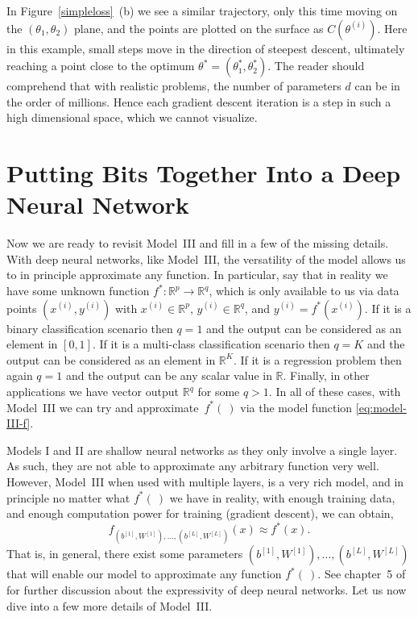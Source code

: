 \documentclass[12pt]{article}
\begin{document}
In Figure~\ref{simpleloss}~(b) we see a similar trajectory, only this time moving on the $(\theta_1, \theta_2)$ plane, and the points are plotted on the surface as $C(\theta^{(i)})$. Here in this example, small steps move in the direction of steepest descent, ultimately reaching a point close to the optimum $\theta^* = (\theta_1^*, \theta_2^*)$. The reader should comprehend that with realistic problems, the number of parameters $d$ can be in the order of millions. Hence each gradient descent iteration is a step in such a high dimensional space, which we cannot visualize. 

\section{Putting Bits Together Into a Deep Neural Network}
\label{sec:putting-bits-together}
Now we are ready to revisit Model~III and fill in a few of the missing details. With deep neural networks, like Model~III, the versatility of the model allows us to in principle approximate any function. In particular, say that in reality we have some unknown function $f^*: \mathbb{R}^p \longrightarrow {\mathbb R}^q$, which is only available to us via data points $(x^{(i)}, y^{(i)})$ with $x^{(i)} \in {\mathbb R}^p$, $y^{(i)} \in {\mathbb R}^q$,  and $y^{(i)} = f^*(x^{(i)})$. If it is a binary classification scenario then $q=1$ and the output can be considered as an element in $[0,1]$. If it is a multi-class classification scenario then $q=K$ and the output can be considered as an element in ${\mathbb R}^K$. If it is a regression problem then again $q=1$ and the output can be any scalar value in ${\mathbb R}$. Finally, in other applications we have vector output ${\mathbb R}^q$ for some $q>1$. In all of these cases, with Model~III we can try and approximate~$f^*(~)$  via the model function \eqref{eq:model-III-f}.

Models I and II are shallow neural networks as they only involve a single layer. As such, they are not able to approximate any arbitrary function very well. However, Model~III when used with multiple layers, is a very rich model, and in principle no matter what $f^*(~)$ we have in reality, with enough training data, and enough computation power for training (gradient descent), we can obtain,
%
\begin{equation}
\label{eq:mod3-approx}
f_{(b^{[1]}, W^{[1]}), \ldots, (b^{[L]}, W^{[L]})} (x) \approx f^*(x).
\end{equation}
%
That is, in general, there exist some parameters ${(b^{[1]}, W^{[1]}), \ldots, (b^{[L]}, W^{[L]})}$ that will enable our model to approximate any function $f^*(~)$. See chapter~5 of \cite{LiquetMokaNazarathy2024DeepLearning} for further discussion about the expressivity of deep neural networks. Let us now dive into a few more details of Model~III.
\end{document}
